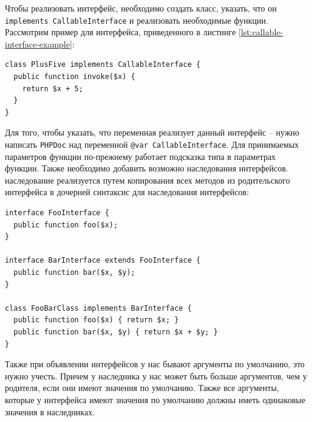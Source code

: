 Чтобы реализовать интерфейс, необходимо создать класс, указать, что он \verb|implements CallableInterface| и реализовать необходимые функции.
Рассмотрим пример для интерфейса, приведенного в листинге \ref{lst:callable-interface-example}:
\begin{lstlisting}
class PlusFive implements CallableInterface {
  public function invoke($x) {
    return $x + 5;
  } 
}
\end{lstlisting}

Для того, чтобы указать, что переменная реализует данный интерфейс -- нужно написать \verb|PHPDoc| \cite{phpdoc} над переменной \verb|@var CallableInterface|.
Для принимаемых параметров функции по-прежнему работает подсказка типа в параметрах функции.
Также необходимо добавить возможно наследования интерфейсов.
наследование реализуется путем копирования всех методов из родительского интерфейса в дочерней синтаксис для наследования интерфейсов:
\begin{lstlisting}
interface FooInterface {
  public function foo($x);
}

interface BarInterface extends FooInterface {
  public function bar($x, $y);
}

class FooBarClass implements BarInterface {
  public function foo($x) { return $x; }
  public function bar($x, $y) { return $x + $y; }
}
\end{lstlisting}

Также при объявлении интерфейсов у нас бывают аргументы по умолчанию, это нужно учесть.
Причем у наследника у нас может быть больше аргументов, чем у родителя, если они имеют значения по умолчанию.
Также все аргументы, которые у интерфейса имеют значения по умолчанию должны иметь одинаковые значения в наследниках.

